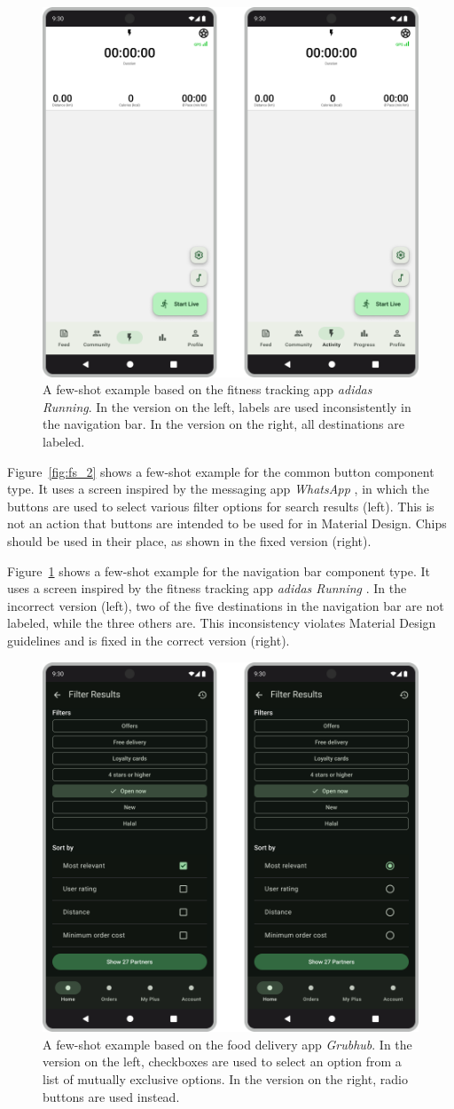 \documentclass[11pt,titlepage,oneside,openany]{book}
\begin{document}
\begin{figure}[H]
	\centering
	\includegraphics[width=.56\textwidth]{figures/few_shot_3.png}
	\caption{A few-shot example based on the fitness tracking app \emph{adidas Running}. In the version on the left, labels are used inconsistently in the navigation bar. In the version on the right, all destinations are labeled.}
	\label{fig:fs_3}
\end{figure}

Figure~\ref{fig:fs_2} shows a few-shot example for the common button component type. It uses a screen inspired by the messaging app {\emph{WhatsApp}} \cite{noauthor_whatsapp_nodate}, in which the buttons are used to select various filter options for search results (left). This is not an action that buttons are intended to be used for in Material Design. Chips should be used in their place, as shown in the fixed version (right). 

Figure~\ref{fig:fs_3} shows a few-shot example for the navigation bar component type. It uses a screen inspired by the fitness tracking app \emph{adidas Running} \cite{runtastic_adidas_nodate}. In the incorrect version (left), two of the five destinations in the navigation bar are not labeled, while the three others are. This inconsistency violates Material Design guidelines and is fixed in the correct version (right). 

\begin{figure}[H]
	\centering
	\includegraphics[width=.56\textwidth]{figures/few_shot_4.png}
	\caption{A few-shot example based on the food delivery app \emph{Grubhub}. In the version on the left, checkboxes are used to select an option from a list of mutually exclusive options. In the version on the right, radio buttons are used instead.}
	\label{fig:fs_4}
\end{figure}
\end{document}
